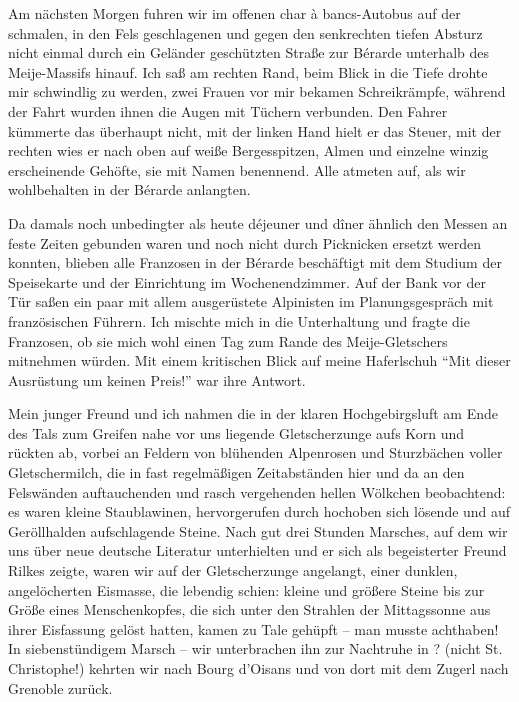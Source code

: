 \documentclass[a5paper,pagesize,10pt,twoside=true]{scrbook}
\begin{document}
Am nächsten Morgen fuhren wir im offenen char à bancs-Autobus auf der schmalen, in den Fels geschlagenen und gegen den senkrechten tiefen Absturz nicht einmal durch ein Geländer geschützten Straße zur Bérarde unterhalb des Meije-Massifs hinauf. Ich saß am rechten Rand, beim Blick in die Tiefe drohte mir schwindlig zu werden, zwei Frauen vor mir bekamen Schreikrämpfe, während der Fahrt wurden ihnen die Augen mit Tüchern verbunden. Den Fahrer kümmerte das überhaupt nicht, mit der linken Hand hielt er das Steuer, mit der rechten wies er nach oben auf weiße Bergesspitzen, Almen und einzelne winzig erscheinende Gehöfte, sie mit Namen benennend. Alle atmeten auf, als wir wohlbehalten in der Bérarde anlangten.

Da damals noch unbedingter als heute déjeuner und dîner ähnlich den Messen an feste Zeiten gebunden waren und noch nicht durch Picknicken ersetzt werden konnten, blieben alle Franzosen in der Bérarde beschäftigt mit dem Studium der Speisekarte und der Einrichtung im Wochenendzimmer. Auf der Bank vor der Tür saßen ein paar mit allem ausgerüstete Alpinisten im Planungsgespräch mit französischen Führern. Ich mischte mich in die Unterhaltung und fragte die Franzosen, ob sie mich wohl einen Tag zum Rande des Meije-Gletschers mitnehmen würden. Mit einem kritischen Blick auf meine Haferlschuh \enquote{Mit dieser Ausrüstung um keinen Preis!} war ihre Antwort.

Mein junger Freund und ich nahmen die in der klaren Hochgebirgsluft am Ende des Tals zum Greifen nahe vor uns liegende Gletscherzunge aufs Korn und rückten ab, vorbei an Feldern von blühenden Alpenrosen und Sturzbächen voller Gletschermilch, die in fast regelmäßigen Zeitabständen hier und da an den Felswänden auftauchenden und rasch vergehenden hellen Wölkchen beobachtend: es waren kleine Staublawinen, hervorgerufen durch hochoben sich lösende und auf Geröllhalden aufschlagende Steine. Nach gut drei Stunden Marsches, auf dem wir uns über neue deutsche Literatur unterhielten und er sich als begeisterter Freund Rilkes zeigte, waren wir auf der Gletscherzunge angelangt, einer dunklen, angelöcherten Eismasse, die lebendig schien: kleine und größere Steine bis zur Größe eines Menschenkopfes, die sich unter den Strahlen der Mittagssonne aus ihrer Eisfassung gelöst hatten, kamen zu Tale gehüpft -- man musste achthaben! In siebenstündigem Marsch -- wir unterbrachen ihn zur Nachtruhe in ? (nicht St. Christophe!) kehrten wir nach Bourg d'Oisans und von dort mit dem Zugerl nach Grenoble zurück.
\end{document}
